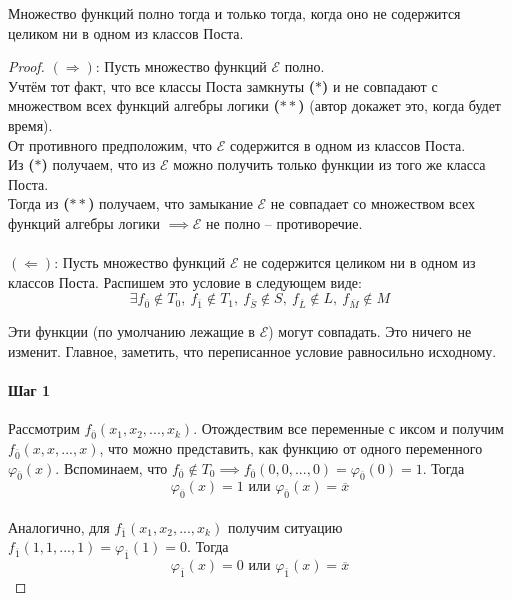 \documentclass[11pt]{article}
\begin{document}
\begin{theorem}
    Множество функций полно тогда и только тогда, когда оно не содержится 
    целиком ни в одном из классов Поста.
\end{theorem}

\begin{proof}
    $(\Longrightarrow)$: Пусть множество функций $\mathcal{E}$ полно. \\ 
    Учтём тот факт, что все классы Поста замкнуты \textbf{($\ast$)} и не совпадают с множеством 
    всех функций алгебры логики \textbf{($\ast\ast$)} (автор докажет это, когда будет время). \\ 
    От противного предположим, что $\mathcal{E}$ содержится в одном из 
    классов Поста. \\ Из \textbf{($\ast$)} получаем, что из $\mathcal{E}$ 
    можно получить только функции из того же класса Поста. \\ 
    Тогда из \textbf{($\ast\ast$)} получаем, что замыкание $\mathcal{E}$ 
    не совпадает со множеством всех функций алгебры логики $\implies \mathcal{E}$ 
    не полно -- противоречие. \\ \\
    $(\Longleftarrow)$: Пусть множество функций $\mathcal{E}$ не содержится 
    целиком ни в одном из классов Поста. Распишем это условие в следующем виде: \\
    \[\exists f_{\overline{0}} \notin T_0, \ f_{\overline{1}} \notin T_1, \ 
    f_{\overline{S}} \notin S, \ f_{\overline{L}} \notin L, \ f_{\overline{M}} \notin M\] 

    \begin{remark}
        Эти функции (по умолчанию лежащие в $\mathcal{E}$) могут совпадать. 
        Это ничего не изменит. Главное, заметить, что переписанное условие равносильно исходному.
    \end{remark}

    \paragraph{Шаг 1}
    Рассмотрим $f_{\overline{0}}(x_1, x_2, ..., x_k)$. Отождествим все переменные с 
    иксом и получим $f_{\overline{0}}(x, x, ..., x)$, что можно представить, как 
    функцию от одного переменного $\varphi_{\overline{0}}(x)$. Вспоминаем, что 
    $f_{\overline{0}} \notin T_0 \implies f_{\overline{0}}(0, 0, ..., 0) = 
    \varphi_{\overline{0}}(0) = 1$. Тогда \[\varphi_{\overline{0}}(x) = 1 
    \text{ или } \varphi_{\overline{0}}(x) = \overline{x}\] \\ Аналогично, для 
    $f_{\overline{1}}(x_1, x_2, ..., x_k)$ получим ситуацию $f_{\overline{1}}(1, 1, 
    ..., 1) = \varphi_{\overline{1}}(1) = 0$. Тогда \[\varphi_{\overline{1}}(x) = 0 
    \text{ или } \varphi_{\overline{1}}(x) = \overline{x}\]

\end{proof}
\end{document}
